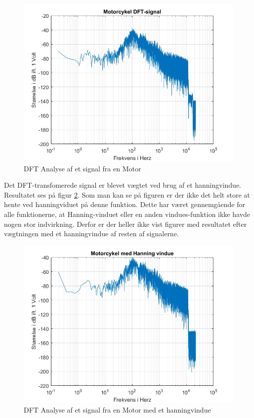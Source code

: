 \begin{figure}[H]
	\centering
	\includegraphics[width=120mm]{figures/Motor/DFT.jpg}
	\caption{DFT Analyse af et signal fra en Motor}
	\label{fig:Motor DFT}
\end{figure}

Det DFT-transfomerede signal er blevet vægtet ved brug af et hanningvindue. Resultatet ses på figur \ref{fig:Motor hanning}. Som man kan se på figuren er der ikke det helt store at hente ved hanningviduet på denne funktion. Dette har været gennemgående for alle funktionerne, at Hanning-vinduet eller en anden vindues-funktion ikke havde nogen stor indvirkning. Derfor er der heller ikke vist figurer med resultatet efter vægtningen med et hanningvindue af resten af signalerne.
\begin{figure}[H]
	\centering
	\includegraphics[width=120mm]{figures/Motor/hanning.jpg}
	\caption{DFT Analyse af et signal fra en Motor med et hanningvindue}
	\label{fig:Motor hanning}
\end{figure}

